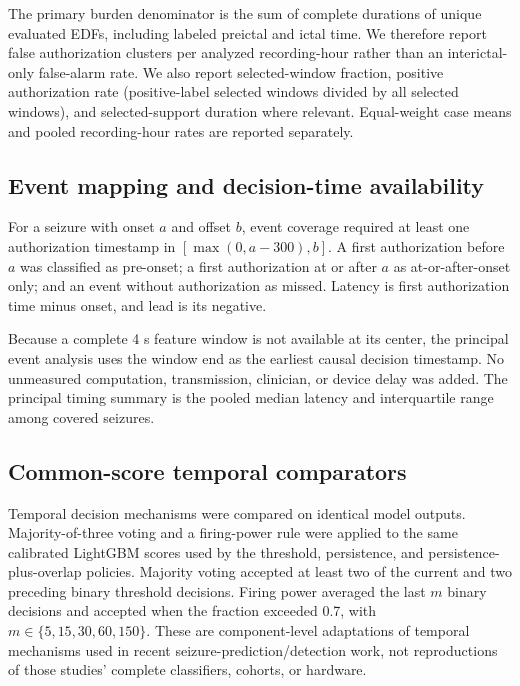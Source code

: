 \documentclass[11pt,a4paper]{article}
\begin{document}
The primary burden denominator is the sum of complete durations of unique evaluated EDFs, including labeled preictal and ictal time. We therefore report false authorization clusters per analyzed recording-hour rather than an interictal-only false-alarm rate. We also report selected-window fraction, positive authorization rate (positive-label selected windows divided by all selected windows), and selected-support duration where relevant. Equal-weight case means and pooled recording-hour rates are reported separately.

\subsection{Event mapping and decision-time availability}
\label{sec:timing}
For a seizure with onset $a$ and offset $b$, event coverage required at least one authorization timestamp in $[\max(0,a-300),b]$. A first authorization before $a$ was classified as pre-onset; a first authorization at or after $a$ as at-or-after-onset only; and an event without authorization as missed. Latency is first authorization time minus onset, and lead is its negative.

Because a complete 4 s feature window is not available at its center, the principal event analysis uses the window end as the earliest causal decision timestamp. No unmeasured computation, transmission, clinician, or device delay was added. The principal timing summary is the pooled median latency and interquartile range among covered seizures.

\subsection{Common-score temporal comparators}
\label{sec:comparators}
Temporal decision mechanisms were compared on identical model outputs. Majority-of-three voting and a firing-power rule were applied to the same calibrated LightGBM scores used by the threshold, persistence, and persistence-plus-overlap policies. Majority voting accepted at least two of the current and two preceding binary threshold decisions. Firing power averaged the last $m$ binary decisions and accepted when the fraction exceeded 0.7, with $m\in\{5,15,30,60,150\}$. These are component-level adaptations of temporal mechanisms used in recent seizure-prediction/detection work\citep{andrade2024samplealarm,batista2024postprocessing,ingolfsson2024artifact}, not reproductions of those studies' complete classifiers, cohorts, or hardware.
\end{document}
